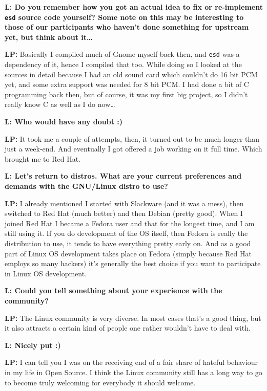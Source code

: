 \documentclass[10pt, a5paper]{article}
\begin{document}
\begin{Parallel}[p]{}{}
{{\noindent \bf L: Do you remember how you got an actual idea to fix or re-implement \verb!esd! source code yourself? Some note on this may be interesting to those of our participants who haven't done something for upstream yet, but think about it\ldots}

{\noindent \bf LP:} Basically I compiled much of Gnome myself back then, and \verb!esd! was a dependency of it, hence I compiled that too. While doing so I looked at the sources in detail because I had an old sound card which couldn't do 16 bit PCM yet, and some extra support was needed for 8 bit PCM. I had done a bit of C programming back then, but of course, it was my first big project, so I didn't really know C as well as I do now\ldots

{\noindent \bf L:  Who would have any doubt :)}

{\noindent \bf LP:} It took me a couple of attempts, then, it turned out to be much longer than just a week-end. And eventually I got offered a job working on it full time. Which brought me to Red Hat.

{\noindent \bf L: Let's return to distros. What are your current preferences and demands with the GNU/Linux distro to use? }

{\noindent \bf LP:} I already mentioned I started with Slackware (and it was a mess), then switched to Red Hat (much better) and then Debian (pretty good). When I joined Red Hat I became a Fedora user and that for the longest time, and I am still using it. If you do development of the OS itself, then Fedora is really the distribution to use, it tends to have everything pretty early on. And as a good part of Linux OS development takes place on Fedora (simply because Red Hat employs so many hackers) it's generally the best choice if you want to participate in Linux OS development.

{\noindent \bf L:  Could you tell something about your experience with the community?}

{\noindent \bf LP:} The Linux community is very diverse. In most cases that's a good thing, but it also attracts a certain kind of people one rather wouldn't have to deal with. 

{\noindent \bf L: Nicely put :) }

{\noindent \bf LP:}  I can tell you I was on the receiving end of a fair share of hateful behaviour in my life in Open Source. I think the Linux community still has a long way to go to become truly welcoming for everybody it should welcome.

}
\end{Parallel}
\end{document}
